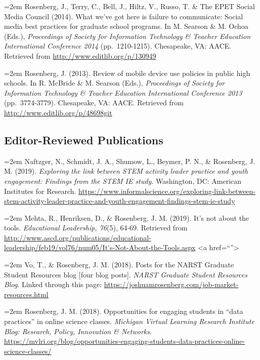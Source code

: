 \documentclass[
  14,
]{article}
\begin{document}
\hangindent=2em Rosenberg, J., Terry, C., Bell, J., Hiltz, V., Russo, T.
\& The EPET Social Media Council (2014). What we've got here is failure
to communicate: Social media best practices for graduate school
programs. In M. Searson \& M. Ochoa (Eds.), \emph{Proceedings of Society
for Information Technology \& Teacher Education International Conference
2014} (pp.~1210-1215). Chesapeake, VA: AACE. Retrieved from
\url{http://www.editlib.org/p/130949}

\hangindent=2em Rosenberg, J. (2013). Review of mobile device use
policies in public high schools. In R. McBride \& M. Searson (Eds.),
\emph{Proceedings of Society for Information Technology \& Teacher
Education International Conference 2013} (pp.~3774-3779). Chesapeake,
VA: AACE. Retrieved from \url{http://www.editlib.org/p/48698git}

\hypertarget{editor-reviewed-publications}{%
\subsection{Editor-Reviewed
Publications}\label{editor-reviewed-publications}}

\hangindent=2em Naftzger, N., Schmidt, J. A., Shumow, L., Beymer, P. N.,
\& Rosenberg, J. M. (2019). \emph{Exploring the link between STEM
activity leader practice and youth engagement: Findings from the STEM IE
study}. Washington, DC: American Institutes for Research.
\url{https://www.informalscience.org/exploring-link-between-stem-activity-leader-practice-and-youth-engagement-findings-stem-ie-study}

\hangindent=2em Mehta, R., Henriksen, D., \& Rosenberg, J. M. (2019).
It's not about the tools. \emph{Educational Leadership, 76}(5), 64-69.
Retrieved from
\url{http://www.ascd.org/publications/educational-leadership/feb19/vol76/num05/It's-Not-About-the-Tools.aspx}
\textless a href=``''\textgreater{}

\hangindent=2em Vo, T., \& Rosenberg, J. M. (2018). Posts for the NARST
Graduate Student Resources blog {[}four blog posts{]}. \emph{NARST
Graduate Student Resources Blog}. Linked through this page:
\url{https://joshuamrosenberg.com/job-market-resources.html}

\hangindent=2em Rosenberg, J. M. (2018). Opportunities for engaging
students in ``data practices'' in online science classes. \emph{Michigan
Virtual Learning Research Institute Blog: Research, Policy, Innovation
\& Networks}.
\url{https://mvlri.org/blog/opportunities-engaging-students-data-practices-online-science-classes/}
\end{document}
